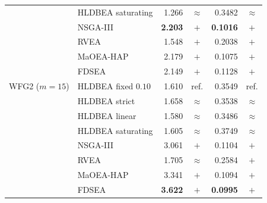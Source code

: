 \begin{table}[!htbp]
\begin{tabular}{|l|l|r|c|r|c|}
 & HLDBEA saturating & 1.266 & $\approx$ & 0.3482 & $\approx$ \\
 & NSGA-III & \textbf{2.203} & $+$ & \textbf{0.1016} & $+$ \\
 & RVEA & 1.548 & $+$ & 0.2038 & $+$ \\
 & MaOEA-HAP & 2.179 & $+$ & 0.1075 & $+$ \\
 & FDSEA & 2.149 & $+$ & 0.1128 & $+$ \\
\hline
WFG2 ($m=15$) & HLDBEA fixed $0.10$ & 1.610 & ref. & 0.3549 & ref. \\
 & HLDBEA strict & 1.658 & $\approx$ & 0.3538 & $\approx$ \\
 & HLDBEA linear & 1.580 & $\approx$ & 0.3486 & $\approx$ \\
 & HLDBEA saturating & 1.605 & $\approx$ & 0.3749 & $\approx$ \\
 & NSGA-III & 3.061 & $+$ & 0.1104 & $+$ \\
 & RVEA & 1.705 & $\approx$ & 0.2584 & $+$ \\
 & MaOEA-HAP & 3.341 & $+$ & 0.1094 & $+$ \\
 & FDSEA & \textbf{3.622} & $+$ & \textbf{0.0995} & $+$ \\
\hline
\end{tabular}
\end{table}
